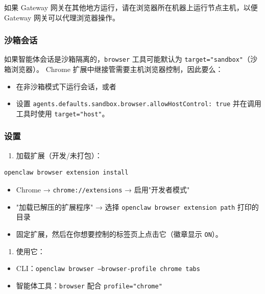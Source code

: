 如果 Gateway 网关在其他地方运行，请在浏览器所在机器上运行节点主机，以便 Gateway 网关可以代理浏览器操作。

\subsubsection{沙箱会话}


如果智能体会话是沙箱隔离的，\texttt{browser} 工具可能默认为 \texttt{target="sandbox"}（沙箱浏览器）。
Chrome 扩展中继接管需要主机浏览器控制，因此要么：

\begin{itemize}
  \item 在非沙箱模式下运行会话，或者
  \item 设置 \texttt{agents.defaults.sandbox.browser.allowHostControl: true} 并在调用工具时使用 \texttt{target="host"}。
\end{itemize}


\subsubsection{设置}


\begin{enumerate}
  \item 加载扩展（开发/未打包）：
\end{enumerate}


\begin{lstlisting}[language=bash]
openclaw browser extension install
\end{lstlisting}


\begin{itemize}
  \item Chrome → \texttt{chrome://extensions} → 启用"开发者模式"
  \item "加载已解压的扩展程序" → 选择 \texttt{openclaw browser extension path} 打印的目录
  \item 固定扩展，然后在你想要控制的标签页上点击它（徽章显示 \texttt{ON}）。
\end{itemize}


\begin{enumerate}
  \item 使用它：
\end{enumerate}


\begin{itemize}
  \item CLI：\texttt{openclaw browser --browser-profile chrome tabs}
  \item 智能体工具：\texttt{browser} 配合 \texttt{profile="chrome"}
\end{itemize}


